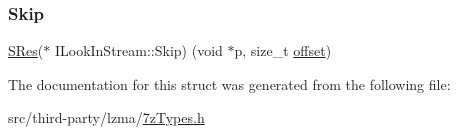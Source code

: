 \mbox{\label{struct_i_look_in_stream_aca2f1b4749efd35470c67654e05f4ede}} 
\subsubsection{\texorpdfstring{Skip}{Skip}}
{\footnotesize\ttfamily \mbox{\hyperlink{7z_types_8h_acc0053eeb62726b68b22e8c7d9e91367}{S\+Res}}($\ast$ I\+Look\+In\+Stream\+::\+Skip) (void $\ast$p, size\+\_\+t \mbox{\hyperlink{ioapi_8h_a601c4660e8a1a14a1b87fe387e934d19}{offset}})}



The documentation for this struct was generated from the following file\+:\begin{DoxyCompactItemize}
\item 
src/third-\/party/lzma/\mbox{\hyperlink{7z_types_8h}{7z\+Types.\+h}}\end{DoxyCompactItemize}
